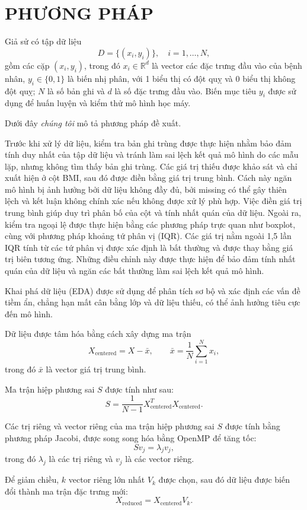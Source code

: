 \chapter{PHƯƠNG PHÁP}
Giả sử có tập dữ liệu
\[
D=\{(x_i,y_i)\},\quad i=1,\ldots,N,
\]
gồm các cặp $(x_i,y_i)$, trong đó $x_i\in\mathbb{R}^d$ là vector các đặc trưng đầu vào của bệnh nhân, $y_i\in\{0,1\}$ là biến nhị phân, với 1 biểu thị có đột quỵ và 0 biểu thị không đột quỵ; $N$ là số bản ghi và $d$ là số đặc trưng đầu vào. Biến mục tiêu $y_i$ được sử dụng để huấn luyện và kiểm thử mô hình học máy.

Dưới đây \textit{chúng tôi} mô tả phương pháp đề xuất.

Trước khi xử lý dữ liệu, kiểm tra bản ghi trùng được thực hiện nhằm bảo đảm tính duy nhất của tập dữ liệu và tránh làm sai lệch kết quả mô hình do các mẫu lặp, nhưng không tìm thấy bản ghi trùng. Các giá trị thiếu được khảo sát và chỉ xuất hiện ở cột BMI, sau đó được điền bằng giá trị trung bình. Cách này ngăn mô hình bị ảnh hưởng bởi dữ liệu không đầy đủ, bởi missing có thể gây thiên lệch và kết luận không chính xác nếu không được xử lý phù hợp. Việc điền giá trị trung bình giúp duy trì phân bố của cột và tính nhất quán của dữ liệu. Ngoài ra, kiểm tra ngoại lệ được thực hiện bằng các phương pháp trực quan như boxplot, cùng với phương pháp khoảng tứ phân vị (IQR). Các giá trị nằm ngoài 1,5 lần IQR tính từ các tứ phân vị được xác định là bất thường và được thay bằng giá trị biên tương ứng. Những điều chỉnh này được thực hiện để bảo đảm tính nhất quán của dữ liệu và ngăn các bất thường làm sai lệch kết quả mô hình.

Khai phá dữ liệu (EDA)  được sử dụng để phân tích sơ bộ và xác định các vấn đề tiềm ẩn, chẳng hạn mất cân bằng lớp và dữ liệu thiếu, có thể ảnh hưởng tiêu cực đến mô hình.

Dữ liệu được tâm hóa bằng cách xây dựng ma trận
\[
X_{\text{centered}} = X-\bar{x},
\qquad
\bar{x}=\frac{1}{N}\sum_{i=1}^{N}x_i,
\]
trong đó $\bar{x}$ là vector giá trị trung bình.

Ma trận hiệp phương sai $S$ được tính như sau:
\[
S=\frac{1}{N-1}X_{\text{centered}}^{T}X_{\text{centered}}.
\]

Các trị riêng và vector riêng của ma trận hiệp phương sai $S$ được tính bằng phương pháp Jacobi, được song song hóa bằng OpenMP để tăng tốc:
\[
Sv_j=\lambda_jv_j,
\]
trong đó $\lambda_j$ là các trị riêng và $v_j$ là các vector riêng.

Để giảm chiều, $k$ vector riêng lớn nhất $V_k$ được chọn, sau đó dữ liệu được biến đổi thành ma trận đặc trưng mới:
\[
X_{\text{reduced}}=X_{\text{centered}}V_k.
\]

